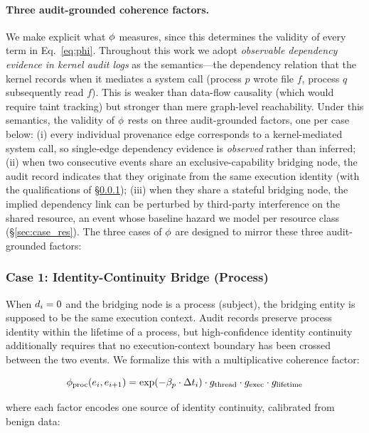 \paragraph{Three audit-grounded coherence factors.} We make explicit what $\phi$ measures, since this determines the validity of every term in Eq.~\ref{eq:phi}. Throughout this work we adopt \emph{observable dependency evidence in kernel audit logs} as the semantics---the dependency relation that the kernel records when it mediates a system call (process $p$ wrote file $f$, process $q$ subsequently read $f$). This is weaker than data-flow causality (which would require taint tracking) but stronger than mere graph-level reachability. Under this semantics, the validity of $\phi$ rests on three audit-grounded factors, one per case below: (i) every individual provenance edge corresponds to a kernel-mediated system call, so single-edge dependency evidence is \emph{observed} rather than inferred; (ii) when two consecutive events share an exclusive-capability bridging node, the audit record indicates that they originate from the same execution identity (with the qualifications of \S\ref{sec:case_proc}); (iii) when they share a stateful bridging node, the implied dependency link can be perturbed by third-party interference on the shared resource, an event whose baseline hazard we model per resource class (\S\ref{sec:case_res}). The three cases of $\phi$ are designed to mirror these three audit-grounded factors:

\subsubsection{Case 1: Identity-Continuity Bridge (Process)}
\label{sec:case_proc}

When $d_i = 0$ and the bridging node is a process (subject), the bridging entity is supposed to be the same execution context. Audit records preserve process identity within the lifetime of a process, but high-confidence identity continuity additionally requires that no execution-context boundary has been crossed between the two events. We formalize this with a multiplicative coherence factor:

\begin{equation}
\phi_{\text{proc}}(e_i, e_{i+1}) = \exp(-\beta_p \cdot \Delta t_i) \cdot g_{\text{thread}} \cdot g_{\text{exec}} \cdot g_{\text{lifetime}}
\label{eq:phi_proc}
\end{equation}

where each factor encodes one source of identity continuity, calibrated from benign data:

